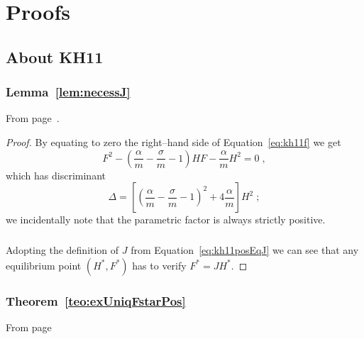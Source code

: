
\chapter{Proofs}

\section{About KH11}
\subsection{ Lemma~\ref{lem:necessJ} }
From page~\pageref{lem:necessJ}.
\begin{proof}
    By equating to zero the right--hand side of Equation~\eqref{eq:kh11f} we get
    $$F^2 - \left( \frac{\alpha}{m} - \frac{\sigma}{m} -1
        \right) H F - \frac{\alpha}{m} H^2 = 0 \; ,$$
    which has discriminant
    $$\Delta = \left[ {\left( \frac{\alpha}{m} - \frac{\sigma}{m} -1
        \right)}^2 + 4 \frac{\alpha}{m}
        \right] H^2 \; ; $$
    we incidentally note that the parametric factor is always strictly positive.

    \paragraph{}
    Adopting the definition of $J$ from Equation~\eqref{eq:kh11posEqJ} we can see that any equilibrium point $(H^*, F^*)$ has to verify $F^* = J H^*$.
\end{proof}

\subsection{ Theorem~\ref{teo:exUniqFstarPos} }
From page~\pageref{teo:exUniqFstarPos}

